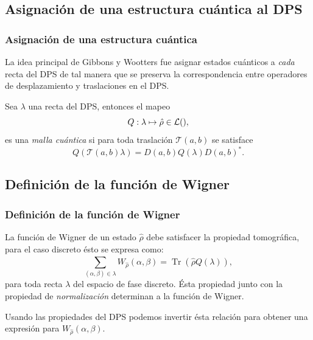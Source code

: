 \documentclass[10pt,spanish]{beamer}
\let\H\relax
\DeclareMathOperator{\H}{\mathcal H}
\DeclareMathOperator{\Tr}{Tr}
\begin{document}
  \subsection{Asignación de una estructura cuántica al DPS}

  \begin{frame}
    \frametitle{Asignación de una estructura cuántica}

    La idea principal de Gibbons y Wootters fue asignar
    estados cuánticos a \textit{cada} recta del DPS de tal
    manera que se preserva la correspondencia entre
    operadores de desplazamiento y traslaciones en el DPS.

    \vspace{5pt}

    \pause

    \begin{definition}
      Sea $\lambda$ una recta del DPS, entonces el mapeo
      \begin{equation}
        Q : \lambda \mapsto \hat\rho \in \mathcal L(\H),
      \end{equation}
      es una \textit{malla cuántica} si para toda traslación
      $\mathcal T(a,b)$ se satisface
      \begin{equation}
        Q\left( \mathcal T(a,b) \lambda \right) 
        =
        D(a,b) Q(\lambda) D(a,b)^{*}.
      \end{equation}
    \end{definition}
  \end{frame}
  
  \subsection{Definición de la función de Wigner}

  \begin{frame}
    \frametitle{Definición de la función de Wigner}

    La función de Wigner de un estado $\hat\rho$ debe
    satisfacer la propiedad tomográfica, para el caso
    discreto ésto se expresa como:
    \begin{equation}
      \sum_{(\alpha,\beta) \in \lambda}^{}
      W_{\hat\rho}(\alpha,\beta)
      = \Tr\left( \hat\rho Q(\lambda) \right),
    \end{equation}
    para toda recta $\lambda$ del espacio de fase discreto.
    Ésta propiedad junto con la propiedad de
    \textit{normalización} determinan a la función de
    Wigner.

    \vspace{15pt}

    \pause

    Usando las propiedades del DPS podemos invertir ésta
    relación para obtener una expresión para
    $W_{\hat\rho}(\alpha,\beta)$.
  \end{frame}
\end{document}
